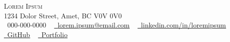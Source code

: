 
\begin{center}
    {\Huge \scshape Lorem Ipsum} \\ \vspace{1pt}
    1234 Dolor Street, Amet, BC V0V 0V0\\ \vspace{1pt}
    \small \raisebox{-0.1\height}\faPhone\ 000-000-0000 ~
    \href{mailto:lorem.ipsum@email.com}{\raisebox{-0.2\height}\faEnvelope\  \underline{lorem.ipsum@email.com}} ~
    \href{https://linkedin.com/in/loremipsum/}{\raisebox{-0.2\height}\faLinkedin\ \underline{linkedin.com/in/loremipsum}} ~
    \href{https://github.com/loremipsum}{\raisebox{-0.2\height}\faGithub\ \underline{GitHub}} ~
    \href{https://loremipsum.dev}{\raisebox{-0.2\height}\faUser\ \underline{Portfolio}}
    \vspace{-8pt}
\end{center}
